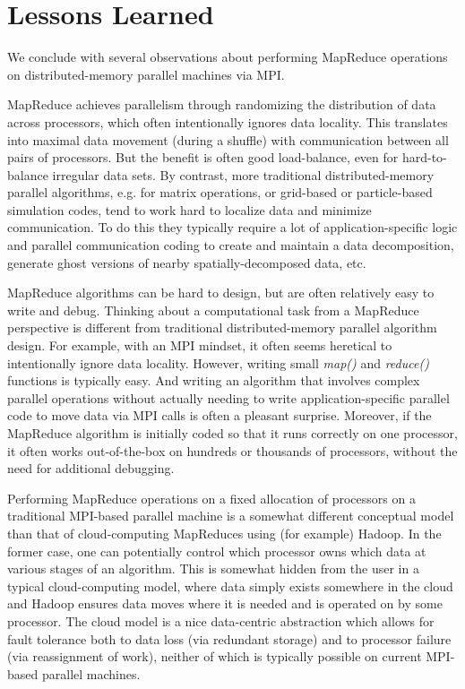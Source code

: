 \section{Lessons Learned}
\label{sec:lessons}

We conclude with several observations about performing MapReduce
operations on distributed-memory parallel machines via MPI.

MapReduce achieves parallelism through randomizing the distribution of
data across processors, which often intentionally ignores data
locality.  This translates into maximal data movement (during a
shuffle) with communication between all pairs of processors.  But the
benefit is often good load-balance, even for hard-to-balance irregular
data sets.  By contrast, more traditional distributed-memory parallel
algorithms, e.g. for matrix operations, or grid-based or
particle-based simulation codes, tend to work hard to localize data
and minimize communication.  To do this they typically require a lot
of application-specific logic and parallel communication coding to
create and maintain a data decomposition, generate ghost versions of
nearby spatially-decomposed data, etc.

MapReduce algorithms can be hard to design, but are often relatively
easy to write and debug.  Thinking about a computational task from a
MapReduce perspective is different from traditional distributed-memory
parallel algorithm design.  For example, with an MPI mindset, it often
seems heretical to intentionally ignore data locality.  However,
writing small {\it map()} and {\it reduce()} functions is typically easy.  And
writing an algorithm that involves complex parallel operations
without actually needing to write application-specific parallel code
to move data via MPI calls is often a pleasant surprise.  Moreover,
if the MapReduce algorithm is initially coded so that it runs
correctly on one processor, it often works out-of-the-box on hundreds
or thousands of processors, without the need for additional debugging.

Performing MapReduce operations on a fixed allocation of processors on
a traditional MPI-based parallel machine is a somewhat different
conceptual model than that of cloud-computing MapReduces using (for
example) Hadoop.  In the former case, one can potentially control
which processor owns which data at various stages of an algorithm.
This is somewhat hidden from the user in a typical cloud-computing
model, where data simply exists somewhere in the cloud and Hadoop
ensures data moves where it is needed and is operated on by some
processor.  The cloud model is a nice data-centric abstraction which
allows for fault tolerance both to data loss (via redundant storage)
and to processor failure (via reassignment of work), neither of which
is typically possible on current MPI-based parallel machines.

